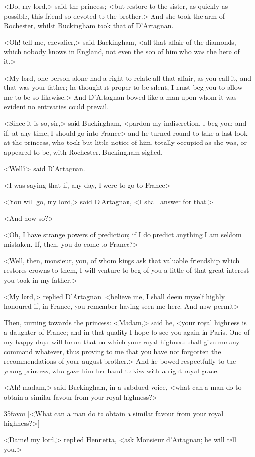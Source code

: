 <Do, my lord,> said the princess; <but restore to the sister, as quickly as possible, this friend so devoted to the brother.> And she took the arm of Rochester, whilst Buckingham took that of D'Artagnan.

<Oh! tell me, chevalier,> said Buckingham, <all that affair of the diamonds, which nobody knows in England, not even the son of him who was the hero of it.>

<My lord, one person alone had a right to relate all that affair, as you call it, and that was your father; he thought it proper to be silent, I must beg you to allow me to be so likewise.> And D'Artagnan bowed like a man upon whom it was evident no entreaties could prevail.

<Since it is so, sir,> said Buckingham, <pardon my indiscretion, I beg you; and if, at any time, I should go into France\longdash> and he turned round to take a last look at the princess, who took but little notice of him, totally occupied as she was, or appeared to be, with Rochester. Buckingham sighed.

<Well?> said D'Artagnan.

<I was saying that if, any day, I were to go to France\longdash>

<You will go, my lord,> said D'Artagnan, <I shall answer for that.>

<And how so?>

<Oh, I have strange powers of prediction; if I do predict anything I am seldom mistaken. If, then, you do come to France?>

<Well, then, monsieur, you, of whom kings ask that valuable friendship which restores crowns to them, I will venture to beg of you a little of that great interest you took in my father.>

<My lord,> replied D'Artagnan, <believe me, I shall deem myself highly honoured if, in France, you remember having seen me here. And now permit\longdash>

Then, turning towards the princess: <Madam,> said he, <your royal highness is a daughter of France; and in that quality I hope to see you again in Paris. One of my happy days will be on that on which your royal highness shall give me any command whatever, thus proving to me that you have not forgotten the recommendations of your august brother.> And he bowed respectfully to the young princess, who gave him her hand to kiss with a right royal grace.

<Ah! madam,> said Buckingham, in a subdued voice, <what can a man do to obtain a similar favour from your royal highness?>

\begin{bwbigpic}
	[\basicscale] 
	{35favor}
	[<What can a man do to obtain a similar favour from your royal highness?>]
\end{bwbigpic}

<Dame! my lord,> replied Henrietta, <ask Monsieur d'Artagnan; he will tell you.> 